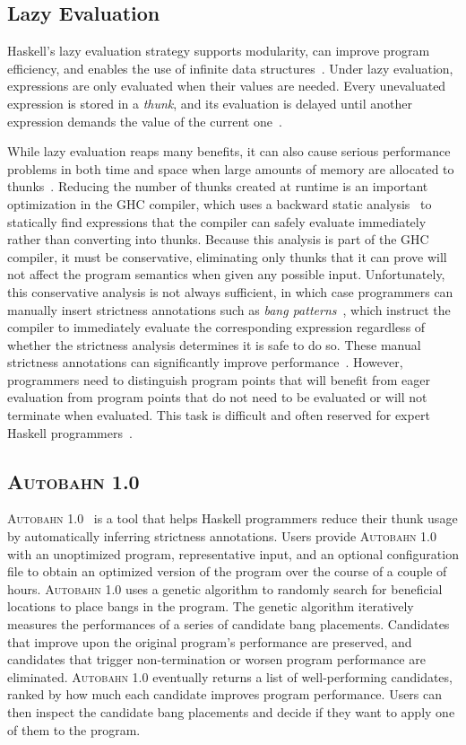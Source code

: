 \documentclass[format=sigplan, review=true]{acmart}
\newcommand{\Ao}[0]{\textsc{Autobahn 1.0}}
\begin{document}
\subsection{Lazy Evaluation}
Haskell's lazy evaluation strategy supports modularity, can improve
program efficiency, and enables the use of infinite data
structures~\cite{Hughes89}. Under lazy evaluation, expressions are
only evaluated when their values are needed. Every unevaluated
expression is stored in a \textit{thunk}, and its evaluation is
delayed until another expression demands the value of the current
one~\cite{PeytonJones89}. 

While lazy evaluation reaps many benefits, it can also cause serious
performance problems in both time and space when large amounts of
memory are allocated to thunks~\cite{Jones94,Santos98,Ennals03}.
Reducing the number of thunks created at runtime is an important
optimization in the GHC compiler, which uses a backward static
analysis~\cite{Sergey14} to statically find expressions that the
compiler can safely evaluate immediately rather than converting into
thunks.  Because this analysis is part of the GHC compiler, it must be
conservative, eliminating only thunks that it can prove will not
affect the program semantics when given any possible input.
Unfortunately, this conservative analysis is not always sufficient, in
which case programmers can manually insert strictness annotations such
as \textit{bang patterns}~\cite{bang}, which instruct the compiler to
immediately evaluate the corresponding expression regardless of
whether the strictness analysis determines it is safe to do so.  These
manual strictness annotations can significantly improve
performance~\cite[Chapter~25]{rwh}. However, programmers need to
distinguish program points that will benefit from eager evaluation
from program points that do not need to be evaluated or will not
terminate when evaluated. This task is difficult and often reserved
for expert Haskell programmers~\cite{Mitchell13}.

\subsection{\Ao}

\Ao~\cite{autobahn-wang} is a tool that helps Haskell programmers 
reduce their thunk usage by automatically inferring strictness
annotations. Users provide \Ao{} with an unoptimized
program, representative input, and an optional configuration file to
obtain an optimized version of the program over the course of a couple
of hours.
\Ao{} uses a genetic algorithm to randomly search for
beneficial locations to place bangs in the program. The genetic
algorithm iteratively measures the performances of a series of
candidate bang placements. Candidates that improve upon the original
program's performance are preserved, and candidates that trigger
non-termination or worsen program performance are
eliminated. \Ao{} eventually returns a list
of well-performing candidates, ranked by how much each candidate
improves program performance. Users can then inspect the candidate
bang placements and decide if they want to apply one of them to the
program.
\end{document}
